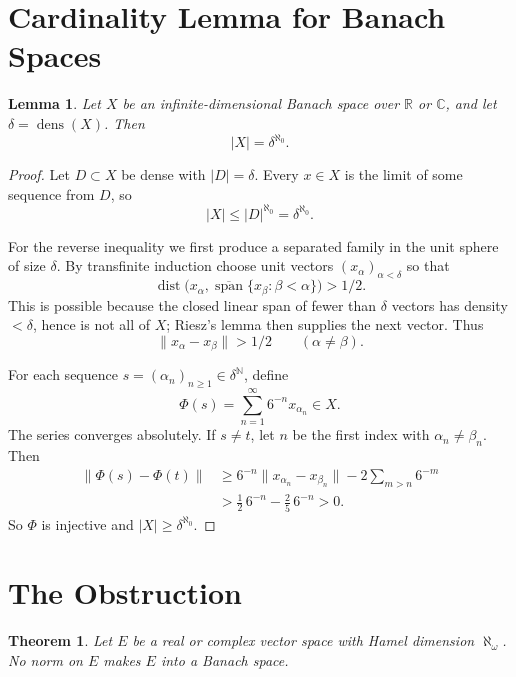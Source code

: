 \documentclass[11pt]{article}
\newtheorem{theorem}{Theorem}
\newtheorem{lemma}{Lemma}
\newcommand{\R}{\mathbb R}
\newcommand{\C}{\mathbb C}
\newcommand{\N}{\mathbb N}
\newcommand{\dens}{\operatorname{dens}}
\newcommand{\spanop}{\operatorname{span}}
\begin{document}
\section*{Cardinality Lemma for Banach Spaces}

\begin{lemma}
\label{lem:banach-cardinality}
Let \(X\) be an infinite-dimensional Banach space over \(\R\) or \(\C\), and
let \(\delta=\dens(X)\).  Then
\[
  |X|=\delta^{\aleph_0}.
\]
\end{lemma}

\begin{proof}
Let \(D\subset X\) be dense with \(|D|=\delta\).  Every \(x\in X\) is the
limit of some sequence from \(D\), so
\[
  |X|\leq |D|^{\aleph_0}=\delta^{\aleph_0}.
\]

For the reverse inequality we first produce a separated family in the unit
sphere of size \(\delta\).  By transfinite induction choose unit vectors
\((x_\alpha)_{\alpha<\delta}\) so that
\[
  \operatorname{dist}\bigl(x_\alpha,
    \overline{\spanop}\{x_\beta:\beta<\alpha\}\bigr)>1/2.
\]
This is possible because the closed linear span of fewer than \(\delta\)
vectors has density \(<\delta\), hence is not all of \(X\); Riesz's lemma then
supplies the next vector.  Thus
\[
  \|x_\alpha-x_\beta\|>1/2\qquad(\alpha\neq\beta).
\]

For each sequence \(s=(\alpha_n)_{n\geq 1}\in\delta^\N\), define
\[
  \Phi(s)=\sum_{n=1}^{\infty}6^{-n}x_{\alpha_n}\in X.
\]
The series converges absolutely.  If \(s\neq t\), let \(n\) be the first index
with \(\alpha_n\neq\beta_n\).  Then
\[
\begin{aligned}
  \|\Phi(s)-\Phi(t)\|
  &\geq 6^{-n}\|x_{\alpha_n}-x_{\beta_n}\|
      -2\sum_{m>n}6^{-m}  \\
  &> \frac12\,6^{-n}-\frac25\,6^{-n}>0.
\end{aligned}
\]
So \(\Phi\) is injective and \(|X|\geq\delta^{\aleph_0}\).
\end{proof}

\section*{The Obstruction}

\begin{theorem}
\label{thm:aleph-omega-obstruction}
Let \(E\) be a real or complex vector space with Hamel dimension
\(\aleph_\omega\).  No norm on \(E\) makes \(E\) into a Banach space.
\end{theorem}
\end{document}
